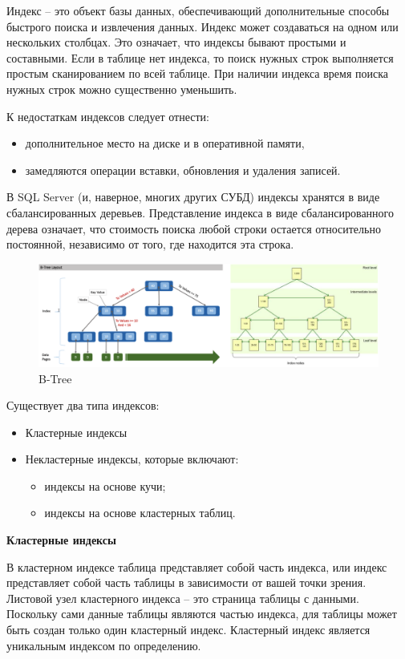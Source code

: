 Индекс – это объект базы данных, обеспечивающий дополнительные способы быстрого поиска и извлечения данных. Индекс может создаваться на одном или нескольких столбцах. 
Это означает, что индексы бывают простыми и составными. Если в таблице нет индекса, то поиск нужных строк выполняется простым сканированием по всей таблице. При наличии индекса время поиска нужных строк можно существенно уменьшить. 

К недостаткам индексов следует отнести:
\begin{itemize}
	\item дополнительное место на диске и в оперативной памяти, 
	\item замедляются операции вставки, обновления и удаления записей. 
\end{itemize}

В SQL Server (и, наверное, многих других СУБД) индексы хранятся в виде сбалансированных деревьев. Представление индекса в виде сбалансированного дерева означает, что стоимость поиска любой строки остается относительно постоянной, независимо от того, где находится эта строка. 

\begin{figure}[ht!]
	\centering
 	\includegraphics[width=18cm, keepaspectratio]{assets/index.png}
	\caption{B-Tree} 
\end{figure}
\FloatBarrier
Существует два типа индексов: 

\begin{itemize}
	\item Кластерные индексы
	\item Некластерные индексы, которые включают: 
	\begin{itemize}[label=--]
		\item индексы на основе кучи;
		\item индексы на основе кластерных таблиц.
	\end{itemize}
\end{itemize}

\textbf{Кластерные индексы}

В кластерном индексе таблица представляет собой часть индекса, или индекс представляет собой часть таблицы в зависимости от вашей точки зрения. Листовой узел кластерного индекса – это страница таблицы с данными. Поскольку сами данные таблицы являются частью индекса, для таблицы может быть создан только один кластерный индекс. Кластерный индекс является уникальным индексом по определению.

